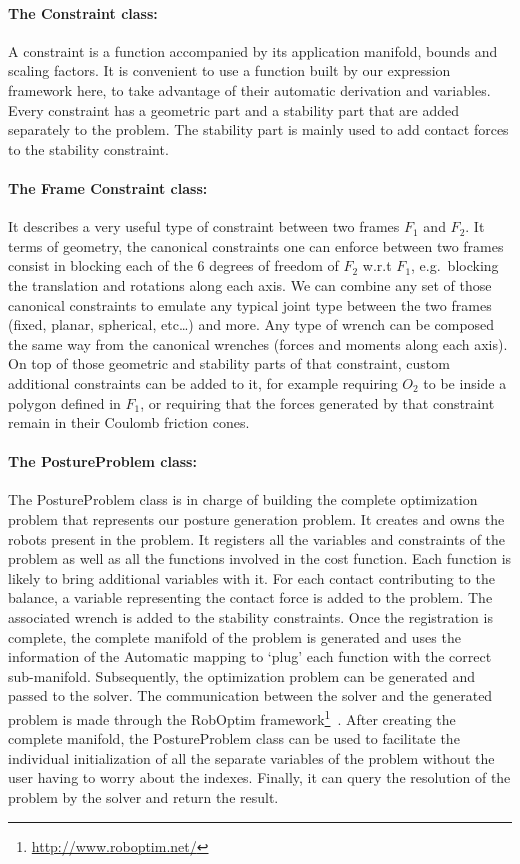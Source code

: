\paragraph{The Constraint class:}
A constraint is a function accompanied by its application manifold, bounds and scaling factors.
It is convenient to use a function built by our expression framework here, to take advantage of their automatic derivation and variables.
Every constraint has a geometric part and a stability part that are added separately to the problem.
The stability part is mainly used to add contact forces to the stability constraint.

\paragraph{The Frame Constraint class:}
It describes a very useful type of constraint between two frames $F_1$ and $F_2$.
It terms of geometry, the canonical constraints one can enforce between two frames consist in blocking each of the 6 degrees of freedom of $F_2$ w.r.t $F_1$, e.g.\ blocking the translation and rotations along each axis.
We can combine any set of those canonical constraints to emulate any typical joint type between the two frames (fixed, planar, spherical, etc\ldots) and more.
Any type of wrench can be composed the same way from the canonical wrenches (forces and moments along each axis).
On top of those geometric and stability parts of that constraint, custom additional constraints can be added to it, for example requiring $O_2$ to be inside a polygon defined in $F_1$, or requiring that the forces generated by that constraint remain in their Coulomb friction cones.

\paragraph{The PostureProblem class:}
The PostureProblem class is in charge of building the complete optimization problem that represents our posture generation problem.
It creates and owns the robots present in the problem.
It registers all the variables and constraints of the problem as well as all the functions involved in the cost function.
Each function is likely to bring additional variables with it.
For each contact contributing to the balance, a variable representing the contact force is added to the problem.
The associated wrench is added to the stability constraints.
Once the registration is complete, the complete manifold of the problem is generated and uses the information of the Automatic mapping to `plug' each function with the correct sub-manifold.
Subsequently, the optimization problem can be generated and passed to the solver.
The communication between the solver and the generated problem is made through the RobOptim framework\footnote{\url{http://www.roboptim.net/}}~\cite{moulard:jsme:2013, moulard:jrsj:2014}.
After creating the complete manifold, the PostureProblem class can be used to facilitate the individual initialization of all the separate variables of the problem without the user having to worry about the indexes.
Finally, it can query the resolution of the problem by the solver and return the result.


